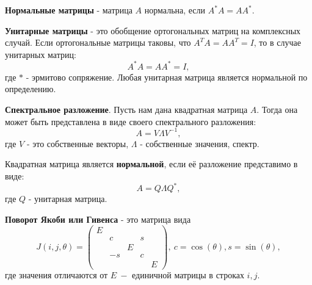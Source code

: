 \textbf{Нормальные матрицы} - матрица \(A\) нормальна, если \(A^*A=AA^*\).

\textbf{Унитарные матрицы} - это обобщение ортогональных матриц на комплексных случай. Если ортогональные матрицы таковы, что \(A^TA=AA^T=I\), то в случае унитарных матриц:
\[A^*A=AA^*=I,\]
где \(*\) - эрмитово сопряжение. Любая унитарная матрица является нормальной по определению.

\textbf{Спектральное разложение}. Пусть нам дана квадратная матрица \(A\). Тогда она может быть представлена в виде своего спектрального разложения:
\[ A=V\Lambda V^{-1},\]
 где \(V\) - это собственные векторы, \(\Lambda\) - собственные значения, спектр.

Квадратная матрица является \textbf{нормальной}, если её разложение представимо в виде:
\[A=Q \Lambda Q^*,\]
где \(Q\) - унитарная матрица. 

\textbf{Поворот Якоби или Гивенса} - это матрица вида
\[ \label{eq:2:1}
    J(i,j,\theta) = 
    \begin{pmatrix}E&&&&\\
        &c&&s\\
        &&E&&\\
        &-s&&c\\
        &&&&E
    \end{pmatrix},\
    c = \cos(\theta), s =\sin(\theta), 
\]
где значения отличаются от \(E\ - \) единичной матрицы в строках \(i, j\).

% 
